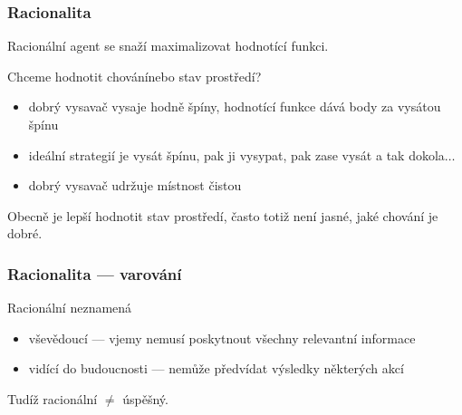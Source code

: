 \documentclass[red,professionalfont]{beamer}
\theoremstyle{definition}
\newcommand{\0}{\mbox{${\bf 0}$}}
\begin{document}
\begin{frame}\frametitle{Racionalita}
\begin{block}{}
Racionální agent se snaží maximalizovat hodnotící funkci.
\end{block}\pause
Chceme hodnotit chování\pause nebo stav prostředí?
\begin{itemize}
 \item dobrý vysavač vysaje hodně špíny, hodnotící funkce dává body za vysátou špínu\pause
 \item[] ideální strategií je vysát špínu, pak ji vysypat, pak zase vysát a tak dokola$\ldots$\pause
 \item dobrý vysavač udržuje místnost čistou
\end{itemize}\pause

\begin{block}{}
 Obecně je lepší hodnotit stav prostředí, často totiž není jasné, jaké chování je dobré.
\end{block}
\end{frame}

\begin{frame}\frametitle{Racionalita --- varování}
Racionální neznamená\pause
\begin{itemize}
 \item vševědoucí --- vjemy nemusí poskytnout všechny relevantní informace\pause
 \item vidící do budoucnosti --- nemůže předvídat výsledky některých akcí\pause
\end{itemize}
Tudíž racionální $\neq$ úspěšný.
\end{frame}
\end{document}
